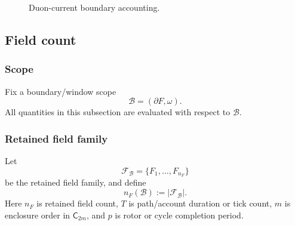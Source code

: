 \begin{figure}[H]
\centering
{}
\caption{Duon-current boundary accounting.}
\label{fig:v39-duon-current-boundary-accounting}
\end{figure}


\subsection{Field count}
\label{sec:field-count-sadar-scope}

\subsubsection{Scope}
\label{subsec:field-count-fixed-scope}
Fix a boundary/window scope
\[
\mathcal B=(\partial F,\omega).
\]
All quantities in this subsection are evaluated with respect to \(\mathcal B\).

\subsubsection{Retained field family}
\label{subsec:retained-field-family}
Let
\[
\mathcal F_{\mathcal B}=\{F_1,\ldots,F_{n_F}\}
\]
be the retained field family, and define
\begin{equation}
n_F(\mathcal B):=|\mathcal F_{\mathcal B}|.
\label{eq:field-count}
\end{equation}
Here \(n_F\) is retained field count, \(T\) is path/account duration or tick count, \(m\) is enclosure order in \(\mathsf C_{2m}\), and \(p\) is rotor or cycle completion period.

